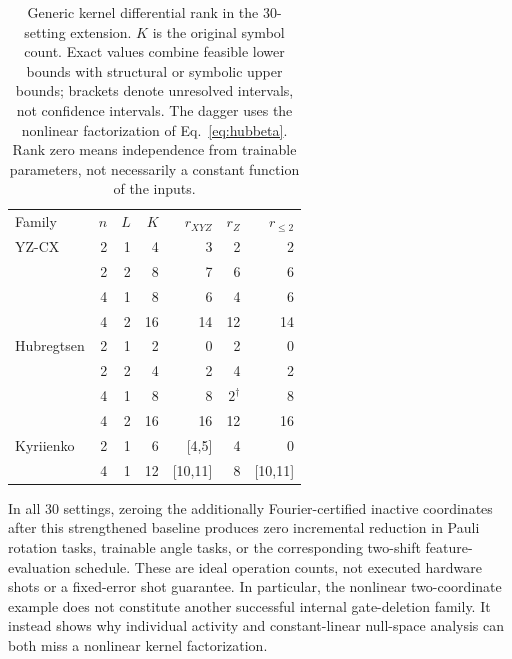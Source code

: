 \begin{table}[t]
\caption{Generic kernel differential rank in the 30-setting extension.
$K$ is the original symbol count. Exact values combine feasible
lower bounds with structural or symbolic upper bounds; brackets
denote unresolved intervals, not confidence intervals. The dagger
uses the nonlinear factorization of Eq.~\eqref{eq:hubbeta}.
Rank zero means independence from trainable parameters, not necessarily
a constant function of the inputs.}
\label{tab:extension}
\begin{ruledtabular}
\begin{tabular}{lrrrrrr}
Family & $n$ & $L$ & $K$ & $r_{XYZ}$ & $r_Z$ & $r_{\le2}$\\
YZ-CX &2&1&4&3&2&2\\
 &2&2&8&7&6&6\\
 &4&1&8&6&4&6\\
 &4&2&16&14&12&14\\
Hubregtsen &2&1&2&0&2&0\\
 &2&2&4&2&4&2\\
 &4&1&8&8&$2^\dagger$&8\\
 &4&2&16&16&12&16\\
Kyriienko &2&1&6&[4,5]&4&0\\
 &4&1&12&[10,11]&8&[10,11]
\end{tabular}
\end{ruledtabular}
\end{table}

In all 30 settings, zeroing the additionally Fourier-certified
inactive coordinates after this strengthened baseline produces zero
incremental reduction in Pauli rotation tasks, trainable angle tasks,
or the corresponding two-shift feature-evaluation schedule. These are
ideal operation counts, not executed hardware shots or a fixed-error
shot guarantee. In particular, the nonlinear two-coordinate example
does not constitute another successful internal gate-deletion family.
It instead shows why individual activity and constant-linear null-space
analysis can both miss a nonlinear kernel factorization.
